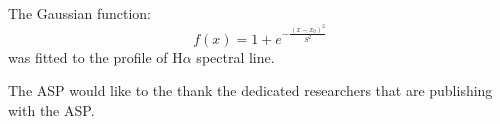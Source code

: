 \documentclass[11pt,twoside]{article}
\begin{document}
The Gaussian function:
%
\begin{equation}
  \label{eq:gauss2}
  f(x) =  1 + e^{- { \frac{(x-x_0)^2 }{ S^2} } }
\end{equation}
%
was fitted to the profile of H$\alpha$ spectral line. 
%
%



\acknowledgements The ASP would like to the thank the dedicated researchers that are publishing with the ASP.

%
\end{document}
